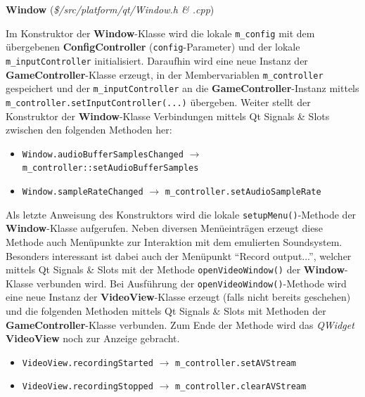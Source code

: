 \documentclass[11pt,a4paper]{scrartcl}
\newcommand{\paratitlecode}[2] {
    \vspace{5mm}
    \large \textbf{#1} \normalsize(\textit{\${#2}})
    \vspace{2mm}\newline
}
\begin{document}
\newpage
\paratitlecode{Window}{/src/platform/qt/Window.h \& .cpp}
Im Konstruktor der \textbf{Window}-Klasse wird die lokale \verb|m_config| mit dem \"ubergebenen \textbf{ConfigController} (\verb|config|-Parameter) und der lokale \verb|m_inputController| initialisiert. Daraufhin wird eine neue Instanz der \textbf{GameController}-Klasse erzeugt, in der Membervariablen \verb|m_controller| gespeichert und der \verb|m_inputController| an die \textbf{GameController}-Instanz mittels \verb|m_controller.setInputController(...)| \"ubergeben. Weiter stellt der Konstruktor der \textbf{Window}-Klasse Verbindungen mittels Qt Signals \& Slots zwischen den folgenden Methoden her:

\begin{itemize}
    \item \verb|Window.audioBufferSamplesChanged| $\rightarrow$ \verb|m_controller::setAudioBufferSamples|
    \item \verb|Window.sampleRateChanged| $\rightarrow$ \verb|m_controller.setAudioSampleRate|
\end{itemize}

Als letzte Anweisung des Konstruktors wird die lokale \verb|setupMenu()|-Methode der \textbf{Window}-Klasse aufgerufen. Neben diversen Men\"ueintr\"agen erzeugt diese Methode auch Men\"upunkte zur Interaktion mit dem emulierten Soundsystem. Besonders interessant ist dabei auch der Men\"upunkt \enquote{Record output...}, welcher mittels Qt Signals \& Slots mit der Methode \verb|openVideoWindow()| der \textbf{Window}-Klasse verbunden wird. Bei Ausf\"uhrung der \verb|openVideoWindow()|-Methode wird eine neue Instanz der \textbf{VideoView}-Klasse erzeugt (falls nicht bereits geschehen) und die folgenden Methoden mittels Qt Signals \& Slots mit Methoden der \textbf{GameController}-Klasse verbunden. Zum Ende der Methode wird das \textit{QWidget} \textbf{VideoView} noch zur Anzeige gebracht.

\begin{itemize}
    \item \verb|VideoView.recordingStarted| $\rightarrow$ \verb|m_controller.setAVStream|
    \item \verb|VideoView.recordingStopped| $\rightarrow$ \verb|m_controller.clearAVStream|
\end{itemize}
\end{document}

